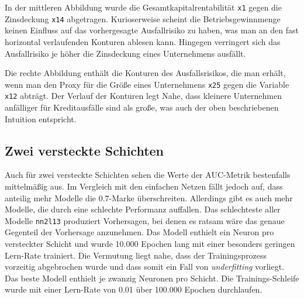 \documentclass{article}
\begin{document}
In der mittleren Abbildung wurde die Gesamtkapitalrentabilit{\"a}t \texttt{x1} gegen die Zinsdeckung \texttt{x14} abgetragen. Kurioserweise scheint die Betriebsgewinnmenge keinen Einfluss auf das vorhergesagte Ausfallrisiko zu haben, was man an den fast horizontal verlaufenden Konturen ablesen kann. Hingegen verringert sich das Ausfallrisiko je h{\"o}her die Zinsdeckung eines Unternehmens ausf{\"a}llt.

Die rechte Abbildung enth{\"a}lt die Konturen des Ausfallsrisikos, die man erh{\"a}lt, wenn man den Proxy f{\"u}r die Gr{\"o}{\ss}e eines Unternehmens \texttt{x25} gegen die Variable \texttt{x12} abtr{\"a}gt. Der Verlauf der Konturen legt Nahe, dass kleinere Unternehmen anf{\"a}lliger f{\"u}r Kreditausf{\"a}lle sind als gro{\ss}e, was auch der oben beschriebenen Intuition entspricht.

\subsection{Zwei versteckte Schichten}

Auch f{\"u}r zwei versteckte Schichten sehen die Werte der AUC-Metrik bestenfalls mittelm{\"a}{\ss}ig aus. Im Vergleich mit den einfachen Netzen f{\"a}llt jedoch auf, dass anteilig mehr Modelle die 0.7-Marke {\"u}berschreiten. Allerdings gibt es auch mehr Modelle, die durch eine schlechte Performanz auffallen. Das schlechteste aller Modelle \texttt{nn2l13} produziert Vorhersagen, bei denen es ratsam w{\"a}re das genaue Gegenteil der Vorhersage anzunehmen. Das Modell enthielt ein Neuron pro versteckter Schicht und wurde 10.000 Epochen lang mit einer besonders geringen Lern-Rate trainiert. Die Vermutung liegt nahe, dass der Trainingsprozess vorzeitig abgebrochen wurde und dass somit ein Fall von \textit{underfitting} vorliegt. Das beste Modell enthielt je zwanzig Neuronen pro Schicht. Die Trainings-Schleife wurde mit einer Lern-Rate von 0.01 {\"u}ber 100.000 Epochen durchlaufen.
\end{document}
